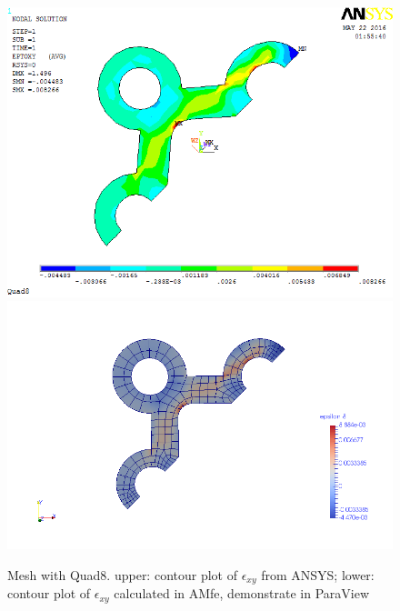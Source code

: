 \begin{figure}[htbp]
	\begin{center}
		\includegraphics[width=13cm,clip]{Quad8_Exy.png} 		
		\includegraphics[width=13cm,clip]{Quad8_Exy_P.png} 		
		\caption{Mesh with Quad8. upper: contour plot of $\epsilon_{xy}$ from ANSYS; lower: contour plot of $\epsilon_{xy}$ calculated in AMfe, demonstrate in ParaView} \label{fig: Quad8_Exy}
	\end{center}
\end{figure}
\clearpage 

